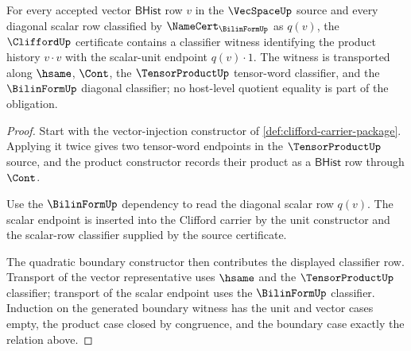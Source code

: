 \begin{theorem}
\label{thm:clifford-quadratic-relation-obligation}
For every accepted vector $\mathsf{BHist}$ row $v$ in the $\VecSpaceUp$ source and every diagonal scalar row classified by $\NameCert_{\BilinFormUp}$ as $q(v)$, the $\CliffordUp$ certificate contains a classifier witness identifying the product history $v \cdot v$ with the scalar-unit endpoint $q(v) \cdot 1$. The witness is transported along $\hsame$, $\Cont$, the $\TensorProductUp$ tensor-word classifier, and the $\BilinFormUp$ diagonal classifier; no host-level quotient equality is part of the obligation.
\end{theorem}
\begin{proof}
Start with the vector-injection constructor of \autoref{def:clifford-carrier-package}. Applying it twice gives two tensor-word endpoints in the $\TensorProductUp$ source, and the product constructor records their product as a $\mathsf{BHist}$ row through $\Cont$.

Use the $\BilinFormUp$ dependency to read the diagonal scalar row $q(v)$. The scalar endpoint is inserted into the Clifford carrier by the unit constructor and the scalar-row classifier supplied by the source certificate.

	The quadratic boundary constructor then contributes the displayed classifier row. Transport of the vector representative uses $\hsame$ and the $\TensorProductUp$ classifier; transport of the scalar endpoint uses the $\BilinFormUp$ classifier. Induction on the generated boundary witness has the unit and vector cases empty, the product case closed by congruence, and the boundary case exactly the relation above.
	\end{proof}

